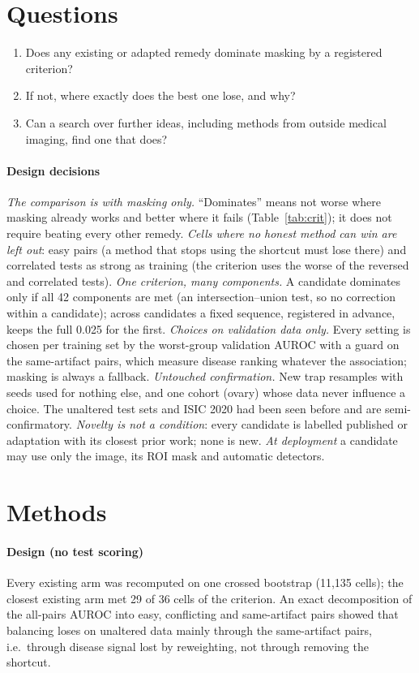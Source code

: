 \section{Questions}
\begin{enumerate}[label=\textbf{Q9\alph*},leftmargin=*]\itemsep1pt
\item Does any existing or adapted remedy dominate masking by a registered criterion?
\item If not, where exactly does the best one lose, and why?
\item Can a search over further ideas, including methods from outside medical imaging, find one that does?
\end{enumerate}
\paragraph{Design decisions} \emph{The comparison is with masking only.} ``Dominates'' means not worse where masking
already works and better where it fails (Table~\ref{tab:crit}); it does not require beating every other remedy.
\emph{Cells where no honest method can win are left out}: easy pairs (a method that stops using the shortcut must lose
there) and correlated tests as strong as training (the criterion uses the worse of the reversed and correlated tests).
\emph{One criterion, many components.} A candidate dominates only if all 42 components are met (an intersection--union
test, so no correction within a candidate); across candidates a fixed sequence, registered in advance, keeps the full
0.025 for the first. \emph{Choices on validation data only.} Every setting is chosen per training set by the worst-group
validation AUROC with a guard on the same-artifact pairs, which measure disease ranking whatever the association; masking
is always a fallback. \emph{Untouched confirmation.} New trap resamples with seeds used for nothing else, and one cohort
(ovary) whose data never influence a choice. The unaltered test sets and ISIC 2020 had been seen before and are
semi-confirmatory. \emph{Novelty is not a condition}: every candidate is labelled published or adaptation with its closest
prior work; none is new. \emph{At deployment} a candidate may use only the image, its ROI mask and automatic detectors.

\section{Methods}
\paragraph{Design (no test scoring)} Every existing arm was recomputed on one crossed bootstrap (11{,}135 cells); the
closest existing arm met 29 of 36 cells of the criterion. An exact decomposition of the all-pairs AUROC into easy,
conflicting and same-artifact pairs showed that balancing loses on unaltered data mainly through the same-artifact
pairs, i.e.\ through disease signal lost by reweighting, not through removing the shortcut.
